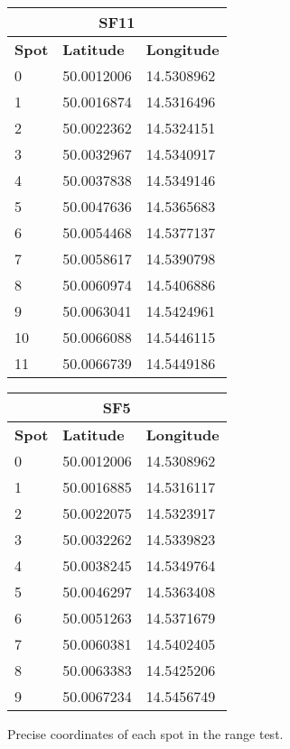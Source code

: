 \begin{figure}[H]
    \centering
    \begin{minipage}[t]{.45\textwidth}
        \centering
        \vspace{0em}
        \begin{tabular}{|l|l|l|}
        \multicolumn{3}{c}{\textbf{SF11}} \\ \hline
        \textbf{Spot} & \textbf{Latitude} & \textbf{Longitude} \\ \hline
        0   & 50.0012006 & 14.5308962 \\ \hline
        1   & 50.0016874 & 14.5316496 \\ \hline
        2   & 50.0022362 & 14.5324151 \\ \hline
        3   & 50.0032967 & 14.5340917 \\ \hline
        4   & 50.0037838 & 14.5349146 \\ \hline
        5   & 50.0047636 & 14.5365683 \\ \hline
        6   & 50.0054468 & 14.5377137 \\ \hline
        7   & 50.0058617 & 14.5390798 \\ \hline
        8   & 50.0060974 & 14.5406886 \\ \hline
        9   & 50.0063041 & 14.5424961 \\ \hline
        10  & 50.0066088 & 14.5446115 \\ \hline
        11  & 50.0066739 & 14.5449186 \\ \hline
        \end{tabular}
    \end{minipage}
    \begin{minipage}[t]{.45\textwidth}
        \centering
        \vspace{0em}
        \begin{tabular}{|l|l|l|}
        \multicolumn{3}{c}{\textbf{SF5}} \\ \hline
        \textbf{Spot} & \textbf{Latitude} & \textbf{Longitude} \\ \hline
        0   & 50.0012006 & 14.5308962 \\ \hline
        1   & 50.0016885 & 14.5316117 \\ \hline
        2   & 50.0022075 & 14.5323917 \\ \hline
        3   & 50.0032262 & 14.5339823 \\ \hline
        4   & 50.0038245 & 14.5349764 \\ \hline
        5   & 50.0046297 & 14.5363408 \\ \hline
        6   & 50.0051263 & 14.5371679 \\ \hline
        7   & 50.0060381 & 14.5402405 \\ \hline
        8   & 50.0063383 & 14.5425206 \\ \hline
        9   & 50.0067234 & 14.5456749 \\ \hline
        \end{tabular}
    \end{minipage}
    \caption{Precise coordinates of each spot in the range test.}
\end{figure}

